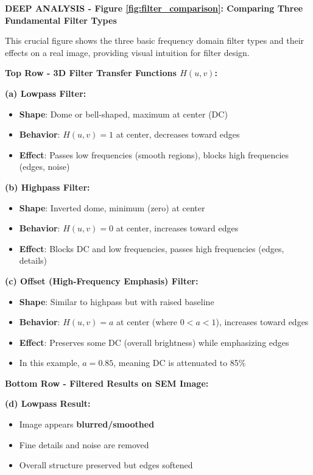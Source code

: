 \documentclass[12pt,a4paper]{article}
\begin{document}
\begin{deepexplanation}
\textbf{DEEP ANALYSIS - Figure \ref{fig:filter_comparison}: Comparing Three Fundamental Filter Types}

This crucial figure shows the three basic frequency domain filter types and their effects on a real image, providing visual intuition for filter design.

\textbf{Top Row - 3D Filter Transfer Functions $H(u,v)$:}

\textbf{(a) Lowpass Filter:}
\begin{itemize}
    \item \textbf{Shape}: Dome or bell-shaped, maximum at center (DC)
    \item \textbf{Behavior}: $H(u,v) = 1$ at center, decreases toward edges
    \item \textbf{Effect}: Passes low frequencies (smooth regions), blocks high frequencies (edges, noise)
\end{itemize}

\textbf{(b) Highpass Filter:}
\begin{itemize}
    \item \textbf{Shape}: Inverted dome, minimum (zero) at center
    \item \textbf{Behavior}: $H(u,v) = 0$ at center, increases toward edges
    \item \textbf{Effect}: Blocks DC and low frequencies, passes high frequencies (edges, details)
\end{itemize}

\textbf{(c) Offset (High-Frequency Emphasis) Filter:}
\begin{itemize}
    \item \textbf{Shape}: Similar to highpass but with raised baseline
    \item \textbf{Behavior}: $H(u,v) = a$ at center (where $0 < a < 1$), increases toward edges
    \item \textbf{Effect}: Preserves some DC (overall brightness) while emphasizing edges
    \item In this example, $a = 0.85$, meaning DC is attenuated to 85\%
\end{itemize}

\textbf{Bottom Row - Filtered Results on SEM Image:}

\textbf{(d) Lowpass Result:}
\begin{itemize}
    \item Image appears \textbf{blurred/smoothed}
    \item Fine details and noise are removed
    \item Overall structure preserved but edges softened
\end{itemize}


\end{deepexplanation}
\end{document}
